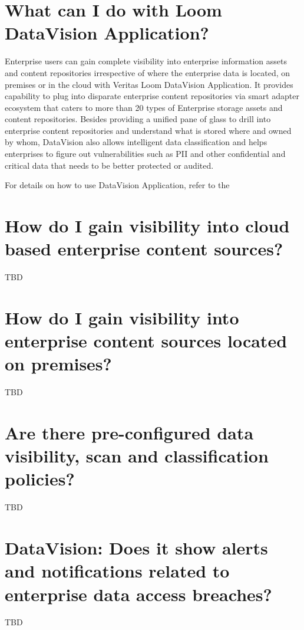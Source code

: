 \documentclass[letterpaper,10pt,english]{sphinxmanual}
\begin{document}
\section{What can I do with Loom DataVision Application?}
\label{\detokenize{loom_trbs_faq:what-can-i-do-with-loom-datavision-application}}
Enterprise users can gain complete visibility into enterprise information assets and content repositories irrespective of where the enterprise data is located, on premises or in the cloud with Veritas Loom DataVision Application. It provides capability to plug into disparate enterprise content repositories via smart adapter ecosystem that caters to more than 20 types of Enterprise storage assets and content repositories.  Besides providing a unified pane of glass to drill into enterprise content repositories and understand what is stored where and owned by whom, DataVision also allows intelligent data classification and helps enterprises to figure out vulnerabilities such as PII and other confidential and critical data that needs to be better protected or audited.

For details on how to use DataVision Application, refer to the 


\section{How do I gain visibility into cloud based enterprise content sources?}
\label{\detokenize{loom_trbs_faq:how-do-i-gain-visibility-into-cloud-based-enterprise-content-sources}}
TBD


\section{How do I gain visibility into enterprise content sources located on premises?}
\label{\detokenize{loom_trbs_faq:how-do-i-gain-visibility-into-enterprise-content-sources-located-on-premises}}
TBD


\section{Are there pre-configured data visibility, scan and classification policies?}
\label{\detokenize{loom_trbs_faq:are-there-pre-configured-data-visibility-scan-and-classification-policies}}
TBD


\section{DataVision: Does it show alerts and notifications related to enterprise data access breaches?}
\label{\detokenize{loom_trbs_faq:datavision-does-it-show-alerts-and-notifications-related-to-enterprise-data-access-breaches}}
TBD
\end{document}
